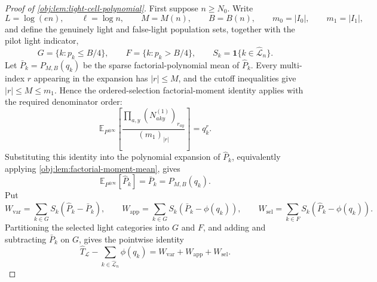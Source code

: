 \begin{proof}[Proof of \cref{obj:lem:light-cell-polynomial}]
First suppose \(n\ge N_0\).  Write
\[
L=\log(en),\qquad \ell=\log n,\qquad M=M(n),\qquad B=B(n),
\qquad m_0=|I_0|,
\qquad m_1=|I_1|,
\]
and define the genuinely light and false-light population sets, together with the pilot light indicator,
\[
G=\{k:p_k\le B/4\},\qquad F=\{k:p_k>B/4\},
\qquad S_k=\mathbf 1\{k\in\widehat{\mathcal L}_n\}.
\]
Let \(\bar P_k=P_{M,B}(q_k)\) be the sparse factorial-polynomial mean of \(\widehat P_k\).  Every multi-index \(r\) appearing in the expansion has \(|r|\le M\), and the cutoff inequalities give \(|r|\le M\le m_1\).  Hence the ordered-selection factorial-moment identity applies with the required denominator order:
\[
\mathbb E_{P^{\otimes\infty}}
\left[
\frac{\prod_{a,y}(N^{(1)}_{aky})_{r_{ay}}}{(m_1)_{|r|}}
\right]
=q_k^r .
\]
Substituting this identity into the polynomial expansion of \(\widehat P_k\), equivalently applying \cref{obj:lem:factorial-moment-mean}, gives
\[
\mathbb E_{P^{\otimes\infty}}[\widehat P_k]
=\bar P_k
=P_{M,B}(q_k).
\]
Put
\[
W_{\mathrm{var}}=\sum_{k\in G}S_k(\widehat P_k-\bar P_k),\qquad
W_{\mathrm{app}}=\sum_{k\in G}S_k(\bar P_k-\phi(q_k)),\qquad
W_{\mathrm{sel}}=\sum_{k\in F}S_k(\widehat P_k-\phi(q_k)).
\]
Partitioning the selected light categories into \(G\) and \(F\), and adding and subtracting \(\bar P_k\) on \(G\), gives the pointwise identity
\[
\widehat T_{\mathcal L}
-
\sum_{k\in\widehat{\mathcal L}_n}\phi(q_k)
=
W_{\mathrm{var}}+W_{\mathrm{app}}+W_{\mathrm{sel}} .
\] %


\end{proof}
